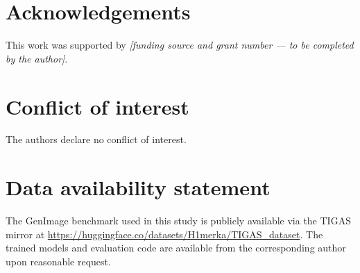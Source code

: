 \documentclass[11pt,a4paper]{article}
\begin{document}
\section*{Acknowledgements}

This work was supported by \emph{[funding source and grant number --- to be completed by the author]}.

\section*{Conflict of interest}

The authors declare no conflict of interest.

\section*{Data availability statement}

The GenImage benchmark used in this study is publicly available via the TIGAS mirror at \url{https://huggingface.co/datasets/H1merka/TIGAS_dataset}. The trained models and evaluation code are available from the corresponding author upon reasonable request.
\end{document}
